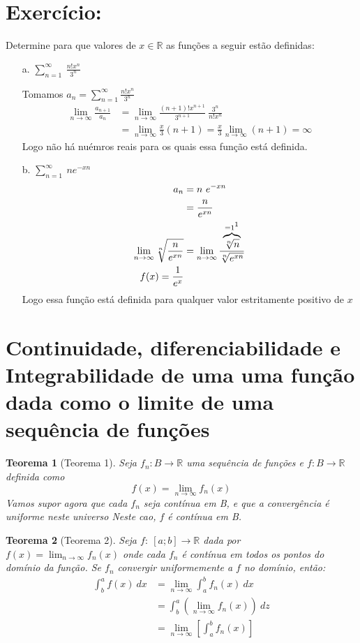 \documentclass[12pt,openany]{book}
\newtheorem{theorem}{Teorema}[section]
\newcommand{\LI}[1][n]{\lim_{{#1} \rightarrow \infty}}
\newcommand{\soma}[2][n]{\sum_{{#1} = #2}^\infty}
\begin{document}
\section*{Exercício:} Determine para que valores de $x \in \mathds{R}$ as funções a seguir estão definidas:
\begin{itemize}
\item [a.] $\displaystyle{\soma{1} \ \frac{n! x^n}{3^n}}$

Tomamos $a_n = \soma{1} \frac{n! x^n}{3^n}$ 
\begin{align*}
\LI \frac{a_{n+1}}{a_n} &= \LI \frac{(n+1)! x^{n+1}}{3^{n+1}}\ \frac{3^n}{n! x^n} \\
&= \LI \frac{x}{3} (n+1) = \frac{x}{3} \LI (n+1) = \infty
\end{align*}
Logo não há nuémros reais para os quais essa função está definida.
\item [b.] $\displaystyle{\soma{1} \ ne^{-xn}}$
\begin{align*}
a_n &= n \ e^{-xn} \\
&= \frac{n}{e^{xn}} \\
\LI \sqrt[n]{\frac{n}{e^{xn}}} &= \LI \frac{\overbrace{\sqrt[n]{n}}^{=1 \footnote{\ref{subsec:ex223}}}}{\sqrt[n]{e^{xn}}} \\
f(x) = \frac{1}{e^x}
\end{align*}
Logo essa função está definida para qualquer valor estritamente positivo de $x$
\end{itemize}

\section{Continuidade, diferenciabilidade e Integrabilidade de uma uma função dada como o limite de uma sequência de funções}

\begin{theorem}[Teorema 1\label{t:3-1}] 
Seja $f_n: B \rightarrow \mathds{R}$ uma sequência de funções e $f: B \rightarrow \mathds{R}$ definida como  $$f(x) = \LI f_n(x)$$ \hspace{5mm}Vamos supor agora que cada $f_n$ seja contínua em B, e que a convergência é uniforme neste universo  Neste cao, $f$ é contínua em B.
\end{theorem}

\begin{theorem}[Teorema 2\label{t:3-2}] 
Seja $f: \ [a;b] \rightarrow \mathds{R}$ dada por $f(x) = \LI f_n (x)$ onde cada $f_n$ é contínua em todos os pontos do domínio da função. Se $f_n$ convergir uniformemente a $f$ no domínio, então: \begin{align*}
\int_b^a f(x) \ dx &= \LI \int_a^b f_n(x) \ dx \\
&= \int_b^a \left( \LI f_n(x) \right) \ dz  \\ 
&= \LI \left[\int_a^b f_n (x) \right] \\
\end{align*}
\end{theorem}
\end{document}
